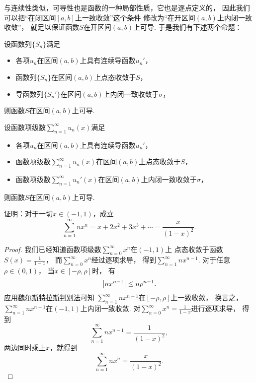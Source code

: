 与连续性类似，可导性也是函数的一种局部性质，它也是逐点定义的，
因此我们可以把“在闭区间\([a,b]\)上一致收敛”这个条件
修改为“在开区间\((a,b)\)上内闭一致收敛”，
就足以保证函数\(S\)在开区间\((a,b)\)上可导.
于是我们有下述两个命题：
\begin{proposition}
设函数列\(\{S_n\}\)满足\begin{itemize}
	\item 各项\(u_n\)在区间\((a,b)\)上具有连续导函数\(u_n'\)，
	\item 函数列\(\{S_n\}\)在区间\((a,b)\)上点态收敛于\(S\)，
	\item 导函数列\(\{S_n'\}\)在区间\((a,b)\)上内闭一致收敛于\(\sigma\)，
\end{itemize}
则函数\(S\)在区间\((a,b)\)上可导.
\end{proposition}
\begin{proposition}
设函数项级数\(\sum_{n=1}^\infty u_n(x)\)满足\begin{itemize}
	\item 各项\(u_n\)在区间\((a,b)\)上具有连续导函数\(u_n'\)，
	\item 函数项级数\(\sum_{n=1}^\infty u_n(x)\)在区间\((a,b)\)上点态收敛于\(S\)，
	\item 函数项级数\(\sum_{n=1}^\infty u_n'(x)\)在区间\((a,b)\)上内闭一致收敛于\(\sigma\)，
\end{itemize}
则函数\(S\)在区间\((a,b)\)上可导.
\end{proposition}

\begin{example}
证明：对于一切\(x\in(-1,1)\)，成立\[
	\sum_{n=1}^\infty n x^n
	= x + 2x^2 + 3x^3 + \dotsb
	= \frac{x}{(1-x)^2}.
\]
\begin{proof}
我们已经知道函数项级数\(\sum_{n=0}^\infty x^n\)在\((-1,1)\)上
点态收敛于函数\(S(x) = \frac1{1-x}\)，
而\(\sum_{n=0}^\infty x^n\)经过逐项求导，
得到\(\sum_{n=1}^\infty n x^{n-1}\).
对于任意\(\rho\in(0,1)\)，
当\(x\in[-\rho,\rho]\)时，
有\[
	\abs{n x^{n-1}} \leq n \rho^{n-1}.
\]
应用\hyperref[theorem:无穷级数.魏尔斯特拉斯判别法]{魏尔斯特拉斯判别法}可知
\(\sum_{n=1}^\infty n x^{n-1}\)在\([-\rho,\rho]\)上一致收敛，
换言之，\(\sum_{n=1}^\infty n x^{n-1}\)在\((-1,1)\)上内闭一致收敛.
对\(\sum_{n=0}^\infty x^n = \frac1{1-x}\)进行逐项求导，
得到\[
	\sum_{n=1}^\infty n x^{n-1}
	= \frac1{(1-x)^2},
\]
两边同时乘上\(x\)，就得到\[
	\sum_{n=1}^\infty n x^n
	= \frac{x}{(1-x)^2}.
\]
\end{proof}
\end{example}


